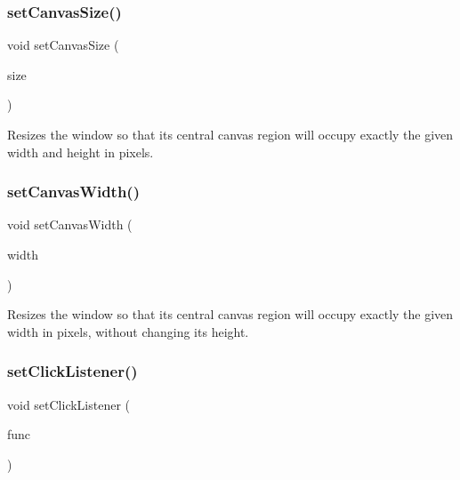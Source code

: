 \subsubsection{\texorpdfstring{set\+Canvas\+Size()}{setCanvasSize()}\hspace{0.1cm}{\footnotesize\ttfamily [2/2]}}
{\footnotesize\ttfamily void set\+Canvas\+Size (\begin{DoxyParamCaption}\item[{const \mbox{\hyperlink{structsgl_1_1GDimension}{G\+Dimension}} \&}]{size }\end{DoxyParamCaption})\hspace{0.3cm}{\ttfamily [virtual]}}



Resizes the window so that its central canvas region will occupy exactly the given width and height in pixels. 

\mbox{\label{classsgl_1_1GWindow_a455beafcfc20a2b7d9ac00499e222f0f}} 
\subsubsection{\texorpdfstring{set\+Canvas\+Width()}{setCanvasWidth()}}
{\footnotesize\ttfamily void set\+Canvas\+Width (\begin{DoxyParamCaption}\item[{double}]{width }\end{DoxyParamCaption})\hspace{0.3cm}{\ttfamily [virtual]}}



Resizes the window so that its central canvas region will occupy exactly the given width in pixels, without changing its height. 

\mbox{\label{classsgl_1_1GWindow_abd40af6921242584d0954f173911b190}} 
\subsubsection{\texorpdfstring{set\+Click\+Listener()}{setClickListener()}\hspace{0.1cm}{\footnotesize\ttfamily [1/2]}}
{\footnotesize\ttfamily void set\+Click\+Listener (\begin{DoxyParamCaption}\item[{\mbox{\hyperlink{namespacesgl_ae9f3e9eab70035da1a2b114e21357b25}{G\+Event\+Listener}}}]{func }\end{DoxyParamCaption})\hspace{0.3cm}{\ttfamily [virtual]}}



